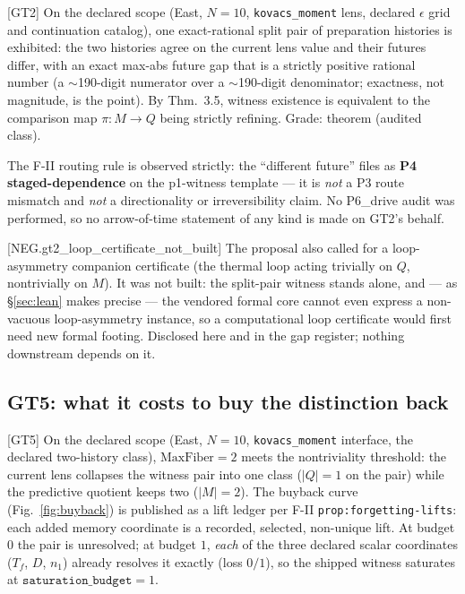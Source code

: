 \documentclass[11pt]{article}
\newcommand{\claimref}[2]{[#1]}
\newcommand{\sbtcite}[1]{\cite{#1}}
\theoremstyle{definition}
\begin{document}
\claimref{GT2}{321f9bffdbf1368ec764a8fcde97d569dd9f4292ee5a98a0b6f30ac9483ce7bf}
On the declared scope (East, $N=10$, \texttt{kovacs\_moment} lens, declared $\epsilon$ grid and
continuation catalog), one exact-rational split pair of preparation histories is exhibited: the
two histories agree on the current lens value and their futures differ, with an exact max-abs
future gap that is a strictly positive rational number (a $\sim$190-digit numerator over a
$\sim$190-digit denominator; exactness, not magnitude, is the point). By \sbtcite{sbt-paper-a}
Thm.~3.5, witness existence is equivalent to the comparison map $\pi: M \to Q$ being strictly
refining. Grade: theorem (audited class).

The F-II routing rule is observed strictly: the ``different future'' files as \textbf{P4
staged-dependence} on the p1-witness template --- it is \emph{not} a P3 route mismatch and
\emph{not} a directionality or irreversibility claim. No P6\_drive audit was performed, so no
arrow-of-time statement of any kind is made on GT2's behalf.

\claimref{NEG.gt2\_loop\_certificate\_not\_built}{321f9bffdbf1368ec764a8fcde97d569dd9f4292ee5a98a0b6f30ac9483ce7bf}
The proposal also called for a loop-asymmetry companion certificate (the thermal loop acting
trivially on $Q$, nontrivially on $M$). It was not built: the split-pair witness stands alone, and
--- as \S\ref{sec:lean} makes precise --- the vendored formal core cannot even express a
non-vacuous loop-asymmetry instance, so a computational loop certificate would first need new
formal footing. Disclosed here and in the gap register; nothing downstream depends on it.

\subsection{GT5: what it costs to buy the distinction back}

\claimref{GT5}{746b44e6c2f7f92364137a202f7306b6afc9e99c413fb4dd3a40d47bfd6f94c8}
On the declared scope (East, $N=10$, \texttt{kovacs\_moment} interface, the declared two-history
class), $\mathrm{MaxFiber} = 2$ meets the nontriviality threshold: the current lens collapses the
witness pair into one class ($|Q| = 1$ on the pair) while the predictive quotient keeps two
($|M| = 2$). The buyback curve (Fig.~\ref{fig:buyback}) is published as a lift ledger per F-II
\texttt{prop:forgetting-lifts}: each added memory coordinate is a recorded, selected, non-unique
lift. At budget $0$ the pair is unresolved; at budget $1$, \emph{each} of the three declared
scalar coordinates ($T_f$, $D$, $n_1$) already resolves it exactly (loss $0/1$), so the shipped
witness saturates at $\texttt{saturation\_budget} = 1$.
\end{document}
